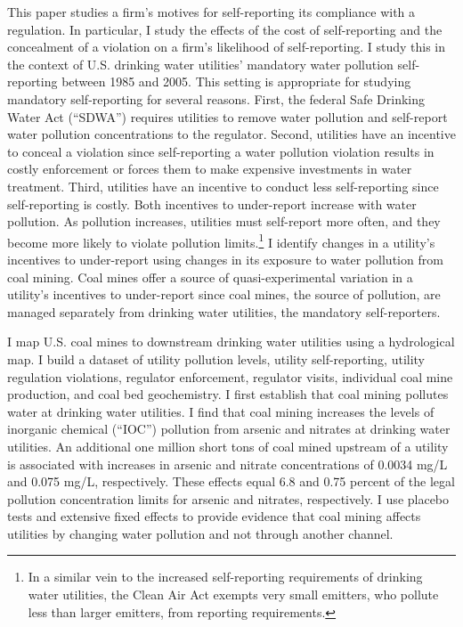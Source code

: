 \documentclass[12pt]{article}
\begin{document}
This paper studies a firm's motives for self-reporting its compliance with a regulation. In particular, I study the effects of the cost of self-reporting and the concealment of a violation on a firm's likelihood of self-reporting. I study this in the context of U.S. drinking water utilities' mandatory water pollution self-reporting between 1985 and 2005. This setting is appropriate for studying mandatory self-reporting for several reasons. First, the federal Safe Drinking Water Act (``SDWA'') requires utilities to remove water pollution and self-report water pollution concentrations to the regulator. Second, utilities have an incentive to conceal a violation since self-reporting a water pollution violation results in costly enforcement or forces them to make expensive investments in water treatment. Third, utilities have an incentive to conduct less self-reporting since self-reporting is costly. Both incentives to under-report increase with water pollution. As pollution increases, utilities must self-report more often, and they become more likely to violate pollution limits.\footnote{In a similar vein to the increased self-reporting requirements of drinking water utilities, the Clean Air Act exempts very small emitters, who pollute less than larger emitters, from reporting requirements.} I identify changes in a utility's incentives to under-report using changes in its exposure to water pollution from coal mining. Coal mines offer a source of quasi-experimental variation in a utility's incentives to under-report since coal mines, the source of pollution, are managed separately from drinking water utilities, the mandatory self-reporters. 

I map U.S. coal mines to downstream drinking water utilities using a hydrological map. I build a dataset of utility pollution levels, utility self-reporting, utility regulation violations, regulator enforcement, regulator visits, individual coal mine production, and coal bed geochemistry. I first establish that coal mining pollutes water at drinking water utilities. I find that coal mining increases the levels of inorganic chemical (``IOC'') pollution from arsenic and nitrates at drinking water utilities. An additional one million short tons of coal mined upstream of a utility is associated with increases in arsenic and nitrate concentrations of 0.0034 mg/L and 0.075 mg/L, respectively. These effects equal 6.8 and 0.75 percent of the legal pollution concentration limits for arsenic and nitrates, respectively. I use placebo tests and extensive fixed effects to provide evidence that coal mining affects utilities by changing water pollution and not through another channel.
\end{document}
